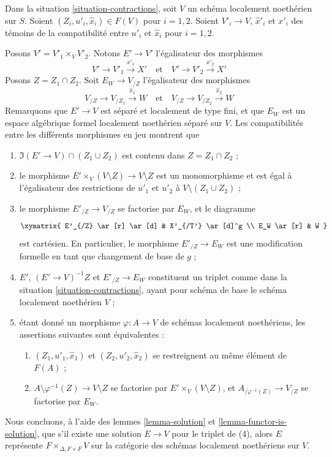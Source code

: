 \begin{remark}
\label{remark-diagonal}
Dans la situation \ref{situation-contractions}, soit $V$ un schéma localement
noethérien sur $S$. Soient $(Z_i, u'_i, \hat x_i) \in F(V)$ pour $i = 1, 2$.
Soient $V'_i \to V$, $\hat x'_i$ et $x'_i$ des témoins de la compatibilité
entre $u'_i$ et $\hat x_i$ pour $i = 1, 2$.

\medskip\noindent
Posons $V' = V'_1 \times_V V'_2$. Notons $E' \to V'$ l'égalisateur des
morphismes
$$
V' \to V'_1 \xrightarrow{x'_1} X'
\quad\text{et}\quad
V' \to V'_2 \xrightarrow{x'_2} X'
$$
Posons $Z = Z_1 \cap Z_2$. Soit $E_W \to V_{/Z}$ l'égalisateur des morphismes
$$
V_{/Z} \to V_{/Z_1} \xrightarrow{\hat x_1} W
\quad\text{et}\quad
V_{/Z} \to V_{/Z_2} \xrightarrow{\hat x_2} W
$$
Remarquons que $E' \to V$ est séparé et localement de type fini, et que $E_W$
est un espace algébrique formel localement noethérien séparé sur $V$. Les
compatibilités entre les différents morphismes en jeu montrent que
\begin{enumerate}
\item $\Im(E' \to V) \cap (Z_1 \cup Z_2)$
est contenu dans $Z = Z_1 \cap Z_2$ ;
\item le morphisme $E' \times_V (V \setminus Z) \to V \setminus Z$
est un monomorphisme et est égal à l'égalisateur des restrictions de $u'_1$ et
$u'_2$ à $V \setminus (Z_1 \cup Z_2)$ ;
\item le morphisme $E'_{/Z} \to V_{/Z}$ se factorise par $E_W$, et le diagramme
$$
\xymatrix{
E'_{/Z} \ar[r] \ar[d] & X'_{/T'} \ar[d]^g \\
E_W \ar[r] & W
}
$$
est cartésien. En particulier, le morphisme $E'_{/Z} \to E_W$ est une
modification formelle en tant que changement de base de $g$ ;
\item $E'$, $(E' \to V)^{-1}Z$ et $E'_{/Z} \to E_W$
constituent un triplet comme dans la situation \ref{situation-contractions},
ayant pour schéma de base le schéma localement noethérien $V$ ;
\item étant donné un morphisme $\varphi : A \to V$ de schémas localement
noethériens, les assertions suivantes sont équivalentes :
\begin{enumerate}
\item $(Z_1, u'_1, \hat x_1)$ et $(Z_2, u'_2, \hat x_2)$
se restreignent au même élément de $F(A)$ ;
\item $A \setminus \varphi^{-1}(Z) \to V \setminus Z$
se factorise par $E' \times_V (V \setminus Z)$, et
$A_{/\varphi^{-1}(Z)} \to V_{/Z}$ se factorise par $E_W$.
\end{enumerate}
\end{enumerate}
Nous concluons, à l'aide des lemmes \ref{lemma-solution} et
\ref{lemma-functor-is-solution}, que s'il existe une solution $E \to V$ pour le
triplet de (4), alors $E$ représente $F \times_{\Delta, F \times F} V$ sur la
catégorie des schémas localement noethériens sur $V$.
\end{remark}

